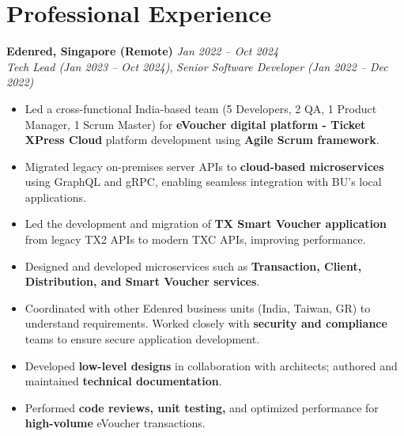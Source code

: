 \documentclass[12pt,a4paper]{article}
\begin{document}
\section*{Professional Experience}

\textbf{Edenred, Singapore (Remote)} \hfill \textit{Jan 2022 -- Oct 2024}\\
\textit{Tech Lead (Jan 2023 -- Oct 2024)},
\newline
\textit{Senior Software Developer (Jan 2022 -- Dec 2022)}
\begin{itemize}
    \item Led a cross-functional India-based team (5 Developers, 2 QA, 1 Product Manager, 1 Scrum Master) for \textbf{eVoucher digital platform - Ticket XPress Cloud} platform development using \textbf{Agile Scrum framework}.
    \item Migrated legacy on-premises server APIs to \textbf{cloud-based microservices} using GraphQL and gRPC, enabling seamless integration with BU's local applications.
    \item Led the development and migration of \textbf{TX Smart Voucher application} from legacy TX2 APIs to modern TXC APIs, improving performance.
    \item Designed and developed microservices such as \textbf{Transaction, Client, Distribution, and Smart Voucher services}.
    \item Coordinated with other Edenred business units (India, Taiwan, GR) to understand requirements. Worked closely with \textbf{security and compliance} teams to ensure secure application development.
    \item Developed \textbf{low-level designs} in collaboration with architects; authored and maintained \textbf{technical documentation}.
    \item Performed \textbf{code reviews, unit testing,} and optimized performance for \textbf{high-volume} eVoucher transactions.
\end{itemize}
\end{document}
